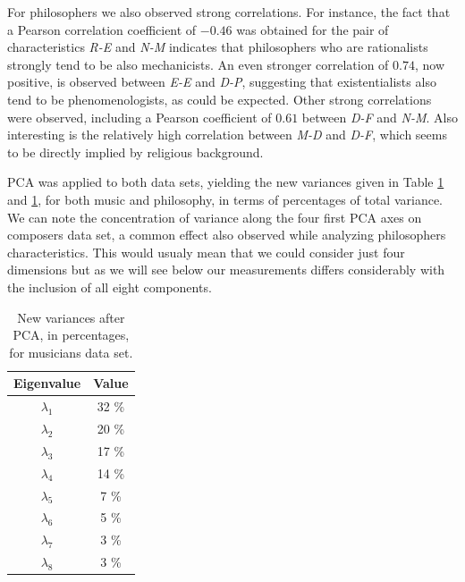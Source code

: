 \documentclass[
 aip,
 jmp,
 amsmath,amssymb,
 reprint,
]{revtex4-1}
\begin{document}
For philosophers we also observed strong correlations. For instance, the fact that a Pearson
correlation coefficient of $-0.46$ was obtained for the pair of
characteristics \emph{R-E} and \emph{N-M} indicates that philosophers
who are rationalists strongly tend to be also mechanicists.  An even
stronger correlation of $0.74$, now positive, is observed between
\emph{E-E} and \emph{D-P}, suggesting that existentialists also tend
to be phenomenologists, as could be expected.  Other strong
correlations were observed, including a Pearson coefficient of $0.61$
between \emph{D-F} and \emph{N-M}.  Also interesting is the relatively
high correlation between \emph{M-D} and \emph{D-F}, which seems to be
directly implied by religious background.

PCA was applied to both data sets, yielding the new variances given
in Table \ref{tab:tableCmus} and \ref{tab:tableCmus}, for both music and philosophy, in terms of percentages of total variance.
We can note the concentration of variance along the four
first PCA axes on composers data set, a common effect also observed while analyzing philosophers characteristics. This would usualy mean that we could
consider just four dimensions but as we will see below our measurements
differs considerably with the inclusion of all eight components.

\begin{table}[ht]
\caption{\label{tab:tableCmus}New variances after PCA, in percentages, for musicians data set.}
\begin{tabular}{|c||c|}
\hline
Eigenvalue  & Value     \\ \hline
$\lambda_1$ &  32 \% \\
$\lambda_2$ &  20 \% \\
$\lambda_3$ &  17 \% \\
$\lambda_4$ &  14 \% \\
$\lambda_5$ &   7 \% \\
$\lambda_6$ &   5 \% \\
$\lambda_7$ &   3 \% \\
$\lambda_8$ &   3 \% \\
\hline
\end{tabular}
\end{table}
\end{document}
